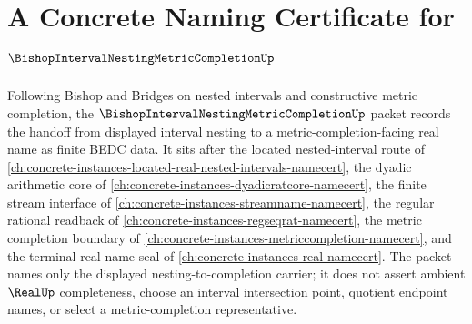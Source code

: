 \chapter{A Concrete Naming Certificate for $\BishopIntervalNestingMetricCompletionUp$}
\label{ch:concrete-instances-bishop-interval-nesting-metric-completion-namecert}

Following Bishop and Bridges on nested intervals and constructive metric completion, the $\BishopIntervalNestingMetricCompletionUp$ packet records the handoff from displayed interval nesting to a metric-completion-facing real name as finite BEDC data. It sits after the located nested-interval route of \autoref{ch:concrete-instances-located-real-nested-intervals-namecert}, the dyadic arithmetic core of \autoref{ch:concrete-instances-dyadicratcore-namecert}, the finite stream interface of \autoref{ch:concrete-instances-streamname-namecert}, the regular rational readback of \autoref{ch:concrete-instances-regseqrat-namecert}, the metric completion boundary of \autoref{ch:concrete-instances-metriccompletion-namecert}, and the terminal real-name seal of \autoref{ch:concrete-instances-real-namecert}. The packet names only the displayed nesting-to-completion carrier; it does not assert ambient $\RealUp$ completeness, choose an interval intersection point, quotient endpoint names, or select a metric-completion representative.

